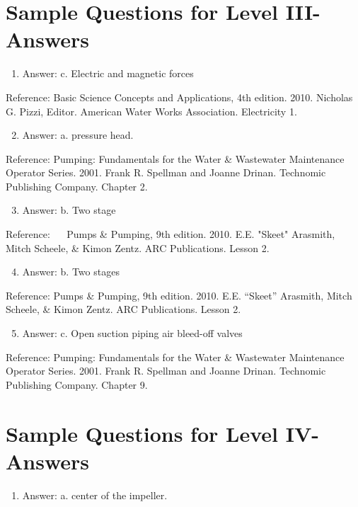 \documentclass[10pt]{article}
\begin{document}
\section{Sample Questions for Level III-Answers}
\begin{enumerate}
  \item Answer: c. Electric and magnetic forces
\end{enumerate}

Reference: Basic Science Concepts and Applications, 4th edition. 2010. Nicholas G. Pizzi, Editor. American Water Works Association. Electricity 1.

\begin{enumerate}
  \setcounter{enumi}{1}
  \item Answer: a. pressure head.
\end{enumerate}

Reference: Pumping: Fundamentals for the Water \& Wastewater Maintenance Operator Series. 2001. Frank R. Spellman and Joanne Drinan. Technomic Publishing Company. Chapter 2.

\begin{enumerate}
  \setcounter{enumi}{2}
  \item Answer: b. Two stage
\end{enumerate}

Reference: $\quad$ Pumps \& Pumping, 9th edition. 2010. E.E. "Skeet" Arasmith, Mitch Scheele, \& Kimon Zentz. ARC Publications. Lesson 2.

\begin{enumerate}
  \setcounter{enumi}{3}
  \item Answer: b. Two stages
\end{enumerate}

Reference: Pumps \& Pumping, 9th edition. 2010. E.E. “Skeet” Arasmith, Mitch Scheele, \& Kimon Zentz. ARC Publications. Lesson 2.

\begin{enumerate}
  \setcounter{enumi}{4}
  \item Answer: c. Open suction piping air bleed-off valves
\end{enumerate}

Reference: Pumping: Fundamentals for the Water \& Wastewater Maintenance Operator Series. 2001. Frank R. Spellman and Joanne Drinan. Technomic Publishing Company. Chapter 9.

\section{Sample Questions for Level IV-Answers}
\begin{enumerate}
  \item Answer: a. center of the impeller.
\end{enumerate}
\end{document}
